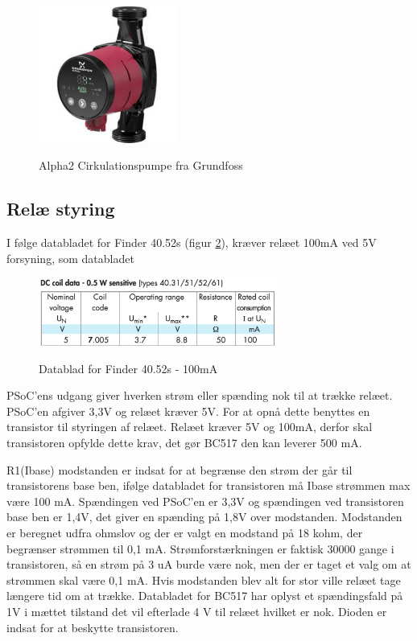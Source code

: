 \begin{figure}[H] \centering
{\includegraphics[width=0.4\textwidth]{filer/design/Billeder/Alpha2}}
\caption{Alpha2 Cirkulationspumpe fra Grundfoss}
\label{lab:Alpha2}
\raggedright
\end{figure} 

\subsection{Relæ styring}

I følge databladet for Finder 40.52s (figur \ref{lab:finder4052s}), kræver relæet 100mA ved 5V forsyning, som databladet

\begin{figure}[H] \centering
{\includegraphics[width=0.7\textwidth]{filer/design/Billeder/finder4052s}}
\caption{Datablad for Finder 40.52s - 100mA}
\label{lab:finder4052s}
\raggedright
\end{figure} 

PSoC'ens udgang giver hverken strøm eller spænding nok til at trække relæet. PSoC'en afgiver 3,3V og relæet kræver 5V. For at opnå dette benyttes en transistor til styringen af relæet. Relæet kræver 5V og 100mA, derfor skal transistoren opfylde dette krav, det gør BC517 den kan leverer 500 mA. \newline

R1(Ibase) modstanden er indsat for at begrænse den strøm der går til transistorens base ben, ifølge databladet for transistoren må Ibase strømmen max være 100 mA. Spændingen ved PSoC'en er 3,3V og spændingen ved transistoren base ben er 1,4V, det giver en spænding på 1,8V over modstanden. Modstanden er beregnet udfra ohmslov og der er valgt en modstand på 18 kohm, der begrænser strømmen til 0,1 mA. Strømforstærkningen er faktisk 30000 gange i transistoren, så en strøm på 3 uA burde være nok, men der er taget et valg om at strømmen skal være 0,1 mA. Hvis modstanden blev alt for stor ville relæet tage længere tid om at trække. Databladet for BC517 har oplyst et spændingsfald på 1V i mættet tilstand det vil efterlade 4 V til relæet hvilket er nok. Dioden er indsat for at beskytte transistoren.

